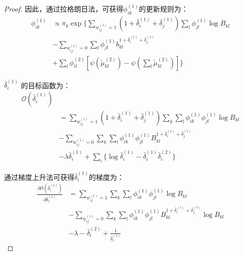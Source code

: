 \begin{proof}
	
	
	因此，通过拉格朗日法，可获得$\phi_{ik}^{(1)}$的更新规则为：
	\begin{equation}
		\begin{split}
			\phi _{ik}^{(1)} & \propto \pi_k \exp\{ \sum_{w_{ij}^{(1)}=1} (1+\bar{\delta}_i^{(1)}+\bar{\delta}_j^{(1)}) \sum_l \phi_{jl}^{(1)} \log B_{kl} \\
			& -\sum_{w_{ij}^{(1)}=0} \sum_l \phi_{jl}^{(1)}  b_{kl}^{1+\bar{\delta}_i^{(1)}+\bar{\delta}_j^{(1)}} \\
			& + \sum_l \phi_{il}^{(2)}[\psi(\tilde{\mu}_{kl}^{(2)}) - \psi(\sum_l \tilde{\mu}_{kl}^{(2)})] \}
		\end{split}
	\end{equation}
	
	$\bar{\delta}_i^{(1)}$ 的目标函数为：
	\begin{equation}
		\begin{split}
			\mathscr{O}(\bar{\delta}_i^{(1)})  \\
			& =\sum_{w_{ij}^{(1)}=1} (1+\bar{\delta}_i^{(1)}+\bar{\delta}_j^{(1)}) \sum_k \sum_l \phi_{ik}^{(1)}\phi_{jl}^{(1)} \log B_{kl} \\
			& -\sum_{w_{ij}^{(1)}=0} \sum_k \sum_l \phi_{ik}^{(1)}\phi_{jl}^{(1)}  B_{kl}^{1+\bar{\delta}_i^{(1)}+\bar{\delta}_j^{(1)}} \\
			&  -\lambda \bar{\delta}_i^{(1)} + \sum_i \{ \log \bar{\delta}_i^{(1)} - \bar{\delta}_i^{(1)} \bar{\delta}_i^{(2)} \}
		\end{split}
	\end{equation}
	
	
	通过梯度上升法可获得$\bar{\delta}_i^{(1)}$的梯度为：
	\begin{equation}
		\begin{split}
			\frac{\partial \mathscr{O}(\bar{\delta}_i^{(1)})}{\partial \bar{\delta}_i^{(1)}} & =\sum_{w_{ij}^{(1)}=1} \sum_k \sum_l \phi_{ik}^{(1)}\phi_{jl}^{(1)} \log B_{kl} \\
			& -\sum_{w_{ij}^{(1)}=0} \sum_k \sum_l \phi_{ik}^{(1)}\phi_{jl}^{(1)}  B_{kl}^{1+\bar{\delta}_i^{(1)}+\bar{\delta}_j^{(1)}} \log B_{kl} \\
			& -\lambda - \bar{\delta}_i^{(2)} + \frac{1}{\bar{\delta}_i^{(1)}}
		\end{split}
		\label{appendix:eq:delta1}
	\end{equation}
	

\end{proof}

